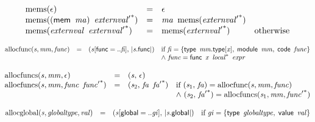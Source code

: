$$
\begin{array}{@{}lcl@{}l@{}}
{\mathrm{mems}}(\epsilon) &=& \epsilon &  \\
{\mathrm{mems}}((\mathsf{mem}~\,{\mathit{ma}})~\,{{\mathit{externval}'}^\ast}) &=& {\mathit{ma}}~\,{\mathrm{mems}}({{\mathit{externval}'}^\ast}) &  \\
{\mathrm{mems}}({\mathit{externval}}~\,{{\mathit{externval}'}^\ast}) &=& {\mathrm{mems}}({{\mathit{externval}'}^\ast}) &\quad
  \mbox{otherwise} \\
\end{array}
$$

\vspace{1ex}

\vspace{1ex}

$$
\begin{array}{@{}lcl@{}l@{}}
{\mathrm{allocfunc}}({\mathit{s}}, {\mathit{mm}}, {\mathit{func}}) &=& ({\mathit{s}}{}[\mathsf{func} = ..{\mathit{fi}}],\, {|{\mathit{s}}.\mathsf{func}|}) &\quad
  \mbox{if}~{\mathit{fi}} = \{ \begin{array}[t]{@{}l@{}}
\mathsf{type}~\,{\mathit{mm}}.\mathsf{type}{}[{\mathit{x}}],\; \mathsf{module}~\,{\mathit{mm}},\; \mathsf{code}~\,{\mathit{func}} \}\end{array} \\
 &&&\quad {\land}~{\mathit{func}} = \mathsf{func}~\,{\mathit{x}}~\,{{\mathit{local}}^\ast}~\,{\mathit{expr}} \\
\end{array}
$$

$$
\begin{array}{@{}lcl@{}l@{}}
{\mathrm{allocfuncs}}({\mathit{s}}, {\mathit{mm}}, \epsilon) &=& ({\mathit{s}},\, \epsilon) &  \\
{\mathrm{allocfuncs}}({\mathit{s}}, {\mathit{mm}}, {\mathit{func}}~\,{{\mathit{func}'}^\ast}) &=& ({\mathit{s}}_{{2}},\, {\mathit{fa}}~\,{{\mathit{fa}'}^\ast}) &\quad
  \mbox{if}~({\mathit{s}}_{{1}},\, {\mathit{fa}}) = {\mathrm{allocfunc}}({\mathit{s}}, {\mathit{mm}}, {\mathit{func}}) \\
 &&&\quad {\land}~({\mathit{s}}_{{2}},\, {{\mathit{fa}'}^\ast}) = {\mathrm{allocfuncs}}({\mathit{s}}_{{1}}, {\mathit{mm}}, {{\mathit{func}'}^\ast}) \\
\end{array}
$$

$$
\begin{array}{@{}lcl@{}l@{}}
{\mathrm{allocglobal}}({\mathit{s}}, {\mathit{globaltype}}, {\mathit{val}}) &=& ({\mathit{s}}{}[\mathsf{global} = ..{\mathit{gi}}],\, {|{\mathit{s}}.\mathsf{global}|}) &\quad
  \mbox{if}~{\mathit{gi}} = \{ \begin{array}[t]{@{}l@{}}
\mathsf{type}~\,{\mathit{globaltype}},\; \mathsf{value}~\,{\mathit{val}} \}\end{array} \\
\end{array}
$$

